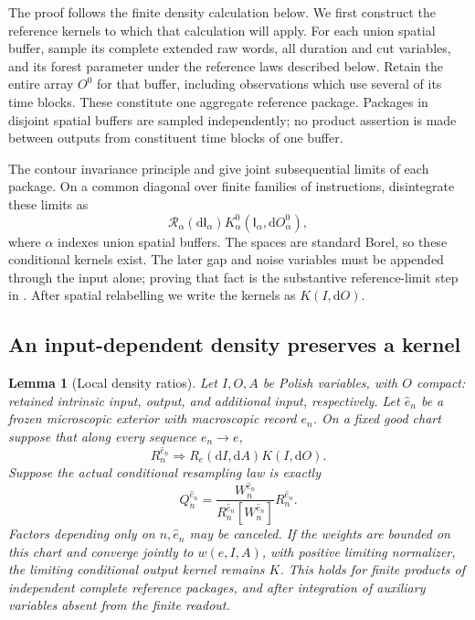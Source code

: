 \documentclass[11pt]{article}
\numberwithin{equation}{section}
\newtheorem{lemma}[theorem]{Lemma}
\theoremstyle{definition}
\theoremstyle{remark}
\newcommand{\1}{\mathbf 1}
\begin{document}
The proof follows the finite density calculation below. We first
construct the reference kernels to which that calculation will apply.
For each union spatial buffer, sample its complete extended raw words,
all duration and cut variables, and its forest parameter under the
reference laws described below. Retain the entire array \(O^0\) for
that buffer, including observations which use several of its time
blocks. These constitute one aggregate reference package. Packages in
disjoint spatial buffers are sampled independently; no product assertion
is made between outputs from constituent time blocks of one buffer.

The contour invariance principle and  give joint
subsequential limits of each package. On a common diagonal over finite
families of instructions, disintegrate these limits as
\begin{equation}\label{ker:reference-packages}
 \mathcal R_\alpha(\mathrm d\mathsf I_\alpha)
 K^0_\alpha(\mathsf I_\alpha,\mathrm d O^0_\alpha),
\end{equation}
where \(\alpha\) indexes union spatial buffers. The spaces are standard
Borel, so these conditional kernels exist. The later gap and noise
variables must be appended through the input alone; proving that fact
is the substantive reference-limit step in .
After spatial relabelling we write the kernels as \(K(I,\mathrm d O)\).

\subsection{An input-dependent density preserves a kernel}

\begin{lemma}[Local density ratios]\label{ker:density-ratio}
Let \(I,O,A\) be Polish variables, with \(O\) compact: retained
intrinsic input, output, and additional input, respectively.
Let \(\widehat e_n\) be a frozen microscopic exterior with macroscopic
record \(e_n\).  On a fixed good chart suppose that along every
sequence \(e_n\to e\),
\begin{equation}
 R_n^{\widehat e_n}\Longrightarrow R_e(\mathrm d I,\mathrm d A)K(I,\mathrm d O).
 \label{ker:reference-limit}
\end{equation}
Suppose the actual conditional resampling law is exactly
\begin{equation}
 Q_n^{\widehat e_n}
 =\frac{W_n^{\widehat e_n}}{R_n^{\widehat e_n}[W_n^{\widehat e_n}]}
 R_n^{\widehat e_n}.
 \label{ker:exact-ratio}
\end{equation}
Factors depending only on \(n,\widehat e_n\) may be canceled.
If the weights are bounded on this chart and converge jointly to
\(w(e,I,A)\), with positive limiting normalizer, the limiting
conditional output kernel remains \(K\).
This holds for finite products of independent complete reference
packages, and after integration of auxiliary variables absent from
the finite readout.
\end{lemma}
\end{document}
